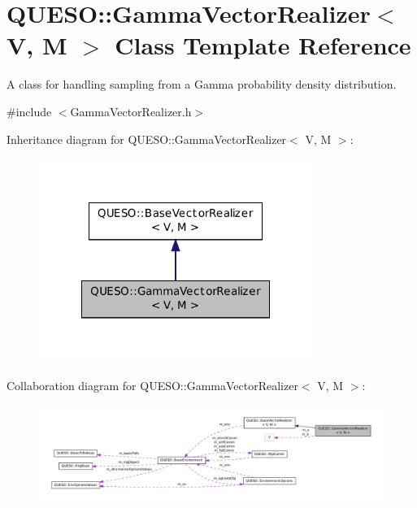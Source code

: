 \hypertarget{class_q_u_e_s_o_1_1_gamma_vector_realizer}{\section{Q\-U\-E\-S\-O\-:\-:Gamma\-Vector\-Realizer$<$ V, M $>$ Class Template Reference}
\label{class_q_u_e_s_o_1_1_gamma_vector_realizer}
}


A class for handling sampling from a Gamma probability density distribution.  




{\ttfamily \#include $<$Gamma\-Vector\-Realizer.\-h$>$}



Inheritance diagram for Q\-U\-E\-S\-O\-:\-:Gamma\-Vector\-Realizer$<$ V, M $>$\-:
\nopagebreak
\begin{figure}[H]
\begin{center}
\leavevmode
\includegraphics[width=252pt]{class_q_u_e_s_o_1_1_gamma_vector_realizer__inherit__graph}
\end{center}
\end{figure}


Collaboration diagram for Q\-U\-E\-S\-O\-:\-:Gamma\-Vector\-Realizer$<$ V, M $>$\-:
\nopagebreak
\begin{figure}[H]
\begin{center}
\leavevmode
\includegraphics[width=350pt]{class_q_u_e_s_o_1_1_gamma_vector_realizer__coll__graph}
\end{center}
\end{figure}
